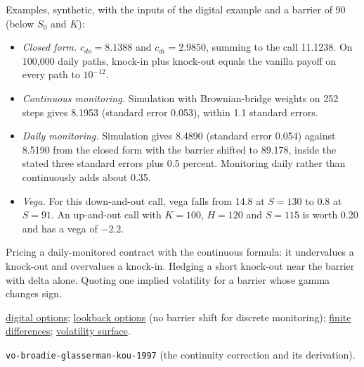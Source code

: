\begin{qfmethod}
 Examples, synthetic, with the inputs of the digital example and a barrier of 90 (below $S_0$ and $K$):
\begin{itemize}
\item \emph{Closed form.} $c_{do}=8.1388$ and $c_{di}=2.9850$, summing to the call 11.1238. On 100{,}000 daily paths, knock-in plus knock-out equals the vanilla payoff on every path to $10^{-12}$.
\item \emph{Continuous monitoring.} Simulation with Brownian-bridge weights on 252 steps gives 8.1953 (standard error 0.053), within 1.1 standard errors.
\item \emph{Daily monitoring.} Simulation gives 8.4890 (standard error 0.054) against 8.5190 from the closed form with the barrier shifted to 89.178, inside the stated three standard errors plus 0.5 percent. Monitoring daily rather than continuously adds about 0.35.
\item \emph{Vega.} For this down-and-out call, vega falls from 14.8 at $S=130$ to 0.8 at $S=91$. An up-and-out call with $K=100$, $H=120$ and $S=115$ is worth 0.20 and has a vega of $-2.2$.
\end{itemize}

 Pricing a daily-monitored contract with the continuous formula: it undervalues a knock-out and overvalues a knock-in. Hedging a short knock-out near the barrier with delta alone. Quoting one implied volatility for a barrier whose gamma changes sign.

 \hyperref[meth:digital-option-valuation]{digital options}; \hyperref[meth:lookback-option-valuation]{lookback options} (no barrier shift for discrete monitoring); \hyperref[meth:finite-difference-option-pricing]{finite differences}; \hyperref[def:implied-volatility-surface]{volatility surface}.

 \nolinkurl{vo-broadie-glasserman-kou-1997} (the continuity correction and its derivation).

\end{qfmethod}

